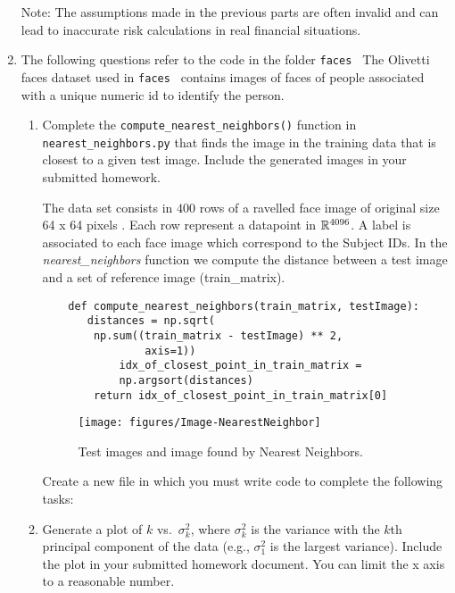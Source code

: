 \documentclass[12pt,twoside]{article}
\begin{document}
\begin{enumerate}
\begin{enumerate}
  \end{enumerate}
  Note: The assumptions made in the previous parts are often
  invalid and can lead to inaccurate risk calculations in real
  financial situations. 
  
  \newpage
  \item The following questions refer to the code in the folder {\tt faces }
  The Olivetti faces dataset used in  {\tt faces }  contains images of faces of people associated with a unique numeric id to identify the person.

  	\begin{enumerate}
		\item Complete the \verb|compute_nearest_neighbors()| function in \verb|nearest_neighbors.py| that finds the image in the training data that is closest to a given test image.  Include the generated images in your submitted homework.


		The data set consists in $400$ rows of a ravelled face image of original size 64 x 64 pixels . Each row represent a datapoint in $\mathbb{R}^{4096}$.
		A label is associated to each face image which correspond to the Subject IDs.
		In the \emph{nearest\_neighbors} function we compute the distance between a test image and a set of reference image (train\_matrix).

\begin{verbatim}
	def compute_nearest_neighbors(train_matrix, testImage):
	   distances = np.sqrt(
	   	np.sum((train_matrix - testImage) ** 2, 
	   			axis=1))
    	    idx_of_closest_point_in_train_matrix = 
	    	np.argsort(distances)
	    return idx_of_closest_point_in_train_matrix[0]
\end{verbatim}


	\begin{figure}[H]
		\centering
		\texttt{[image: figures/Image-NearestNeighbor]}
		\caption{Test images and image found by Nearest Neighbors.}
		\label{fig5}
	\end{figure}


\vspace{0.5cm}Create a new file  in which
you must write code to complete the following tasks:


\item Generate a plot of $k$ vs.~$\sigma^2_k$, where $\sigma^2_k$ is
the variance  with the $k$th principal component of the data (e.g., $\sigma^2_1$
is the largest variance). 
Include
the plot in your submitted homework document. You can limit the x axis to a reasonable number.


\end{enumerate}
\end{enumerate}
\end{document}
